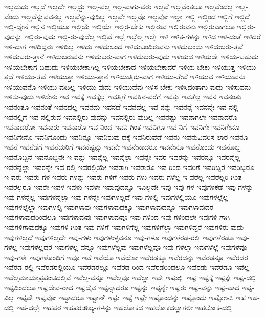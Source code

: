 {ಇಲ್ಲದುದು
ಇಲ್ಲದೆ
ಇಲ್ಲದೇ
ಇಲ್ಲದ್ದು
ಇಲ್ಲ-ವಲ್ಲ
ಇಲ್ಲ-ವಾಗು-ವರು
ಇಲ್ಲವೆ
ಇಲ್ಲವೆಂತಲೂ
ಇಲ್ಲವೆಂದಲ್ಲ
ಇಲ್ಲ-ವೆಂದು
ಇಲ್ಲವೆನ್ನುವವನಲ್ಲ
ಇಲ್ಲವೆನ್ನು-ವುದಿಲ್ಲ
ಇಲ್ಲವೇ
ಇಲ್ಲವೊ
ಇಲ್ಲವೋ
ಇಲ್ಲಾ
ಇಲ್ಲಿ
ಇಲ್ಲಿಂದ
ಇಲ್ಲಿಗೆ
ಇಲ್ಲಿದೆ
ಇಲ್ಲಿ-ದ್ದೇನೆ
ಇಲ್ಲಿನ
ಇಲ್ಲಿಯೂ
ಇಲ್ಲಿಯೆ
ಇಲ್ಲಿಯೇ
ಇಲ್ಲಿರ-ಬೇಕು
ಇಲ್ಲಿರುವ
ಇಲ್ಲಿರುವನು
ಇಲ್ಲಿರುವಾಗಲೂ
ಇಲ್ಲಿರು-ವುದನ್ನು
ಇಲ್ಲಿರು-ವುದು
ಇಲ್ಲಿ-ರು-ವುದೆಲ್ಲ
ಇಲ್ಲಿವೆ
ಇಲ್ಲೆ
ಇಲ್ಲೆಲ್ಲ
ಇಲ್ಲೇ
ಇಳಿ
ಇಳಿತ-ಗಳನ್ನು
ಇಳಿದ
ಇಳಿ-ದಂತೆ
ಇಳಿದರೆ
ಇಳಿ-ದಾಗ
ಇಳಿದಿದ್ದರು
ಇಳಿದಿಲ್ಲ
ಇಳಿದು
ಇಳಿದುಬಂದ
ಇಳಿದುಬಂದಿರುವನು
ಇಳಿದುಬಂದು
ಇಳಿದುಬರು-ತ್ತವೆ
ಇಳಿದುಬರು-ತ್ತಾನೆ
ಇಳಿದುಬರುವನು
ಇಳಿದುಬರು-ವಾಗ
ಇಳಿದುಬರು-ವುದು
ಇಳಿಯದ
ಇಳಿಯದೇ
ಇಳಿಯ-ಬಹುದು
ಇಳಿಯಬೇಕಾಗ-ಬಹುದು
ಇಳಿಯಬೇಕಾಗಿಲ್ಲ
ಇಳಿಯಬೇಕಾದ
ಇಳಿಯಬೇಕಾದರೆ
ಇಳಿಯ-ಬೇಕು
ಇಳಿಯುತ್ತ
ಇಳಿಯು-ತ್ತದೆ
ಇಳಿಯು-ತ್ತವೆ
ಇಳಿಯುತ್ತಾ
ಇಳಿಯು-ತ್ತಾನೆ
ಇಳಿಯುತ್ತಿರು-ವಾಗ
ಇಳಿಯು-ತ್ತೇವೆ
ಇಳಿಯುವ
ಇಳಿಯುವನು
ಇಳಿಯುವನೊ
ಇಳಿಯು-ವುದಿಲ್ಲ
ಇಳಿಯು-ವುದು
ಇಳಿಯುವೆವು
ಇಳಿಸ-ಬೇಕು
ಇಳಿಸಿದಂತಾಗು-ವುದು
ಇಳಿಸುವನು
ಇಳಿಸು-ವುದು
ಇಳಿಸೇನು
ಇವ
ಇವಕ್ಕೆ
ಇವಕ್ಕೆಲ್ಲ
ಇವತ್ತಿಗೆ
ಇವತ್ತಿನ-ವರೆಗೆ
ಇವತ್ತು
ಇವತ್ತೆಲ್ಲ
ಇವನ
ಇವನಂತು
ಇವನಂತೂ
ಇವನಂತೆ
ಇವನದಲ್ಲ
ಇವನದು
ಇವನದೆ
ಇವನದೆಲ್ಲ
ಇವ-ನನ್ನು
ಇವನನ್ನೆ
ಇವನನ್ನೇ
ಇವ-ನಲ್ಲಿ
ಇವನಲ್ಲಿಗೆ
ಇವ-ನಲ್ಲಿರುವ
ಇವನಲ್ಲಿರು-ವುದನ್ನು
ಇವನಲ್ಲಿರು-ವುದಿಲ್ಲ
ಇವನಷ್ಟು
ಇವನಾಗಲೇ
ಇವನಾದರೊ
ಇವನಾದರೋ
ಇವನಾರು
ಇವನಾರೊ
ಇವ-ನಿಂದ
ಇವನಿ-ಗಿಂತ
ಇವನಿಗೂ
ಇವ-ನಿಗೆ
ಇವನಿಗೇ
ಇವನಿಗೇನೂ
ಇವನಿಗೇನೊ
ಇವನಿಗೊಂದು
ಇವನಿನ್ನೂ
ಇವನಿರುವು-ದಕ್ಕೆ
ಇವನಿರುವೆಡೆ
ಇವನು
ಇವನುವಿವರಿಸ-ಲಾರ
ಇವನೂ
ಇವನೆ
ಇವನೆಡೆಗೆ
ಇವನೆದುರಿಗೆ
ಇವನೆಷ್ಟನ್ನು
ಇವನೇ
ಇವನೇನಾದರೂ
ಇವನೇನೂ
ಇವನೊಂದು
ಇವನೊಬ್ಬ
ಇವನೊಬ್ಬನೆ
ಇವನೊಬ್ಬನೇ
ಇ-ವನ್ನು
ಇವನ್ನೆಲ್ಲ
ಇವನ್ನೆಲ್ಲಾ
ಇವನ್ನೇ
ಇವರ
ಇವರನ್ನು
ಇವರನ್ನೂ
ಇವರನ್ನೆಲ್ಲ
ಇವರನ್ನೆಲ್ಲಾ
ಇವರನ್ನೇ
ಇವ-ರಲ್ಲಿ
ಇವರಲ್ಲಿಯೇ
ಇವರಾಗಿ
ಇವರಾರೂ
ಇವ-ರಿಂದ
ಇವರಿಗೆ
ಇವರಿಬ್ಬರ
ಇವರಿಬ್ಬರೂ
ಇ-ವರು
ಇವರು-ಗಳ
ಇವರು-ಗಳನ್ನು
ಇವರು-ಗಳಿಗೆ
ಇವರು-ಗಳು
ಇವರು-ಗಳೆಲ್ಲ
ಇ-ವರೆಲ್ಲ
ಇವರೆಲ್ಲರಿ-ಗಿಂತ
ಇವರೆಲ್ಲರೂ
ಇವರೇ
ಇವಳ
ಇವಳು
ಇವಳೇ
ಇವಾವುದನ್ನೂ
ಇವಿಲ್ಲದೇ
ಇವು
ಇವು-ಗಳ
ಇವುಗಳಕಡೆ
ಇವು-ಗಳನ್ನು
ಇವು-ಗಳನ್ನೆಲ್ಲ
ಇವುಗಳನ್ನೆಲ್ಲಾ
ಇವು-ಗಳನ್ನೇ
ಇವುಗಳಲ್ಲದೆ
ಇವು-ಗಳಲ್ಲಿ
ಇವುಗಳಲ್ಲಿಯೂ
ಇವುಗಳಲ್ಲೆಲ್ಲ
ಇವುಗಳಲ್ಲೆಲ್ಲಾ
ಇವುಗಳಲ್ಸಿ
ಇವುಗಳಾವು
ಇವುಗಳಾವುದಕ್ಕೂ
ಇವುಗಳಾವುದನ್ನೂ
ಇವುಗಳಾವುದರ
ಇವುಗಳಾವುದರಿಂದಲೂ
ಇವುಗಳಾವುವು
ಇವುಗಳಾವುವೂ
ಇವು-ಗಳಿಂದ
ಇವು-ಗಳಿಂದಲೇ
ಇವುಗಳಿ-ಗಾಗಿ
ಇವುಗಳಿಗಾವುದಕ್ಕೂ
ಇವುಗಳಿ-ಗಿಂತ
ಇವು-ಗಳಿಗೆ
ಇವುಗಳಿಗೆಲ್ಲ
ಇವುಗಳಿಗೆಲ್ಲಾ
ಇವುಗಳಿದ್ದರೆ
ಇವುಗಳಿರು-ವುದು
ಇವುಗಳಿಲ್ಲದೆ
ಇವುಗಳಿಲ್ಲದೇ
ಇವು-ಗಳು
ಇವುಗಳುಳ್ಳವನೂ
ಇವು-ಗಳೂ
ಇವುಗಳೆರಡ-ರಲ್ಲಿ
ಇವುಗಳೆರಡೂ
ಇವು-ಗಳೆಲ್ಲ
ಇವುಗಳೆಲ್ಲದರ
ಇವುಗಳೆಲ್ಲ-ವನ್ನೂ
ಇವುಗಳೆಲ್ಲವು
ಇವುಗಳೆಲ್ಲವೂ
ಇವು-ಗಳೆಲ್ಲಾ
ಇವುಗಳೆಲ್ಲೆ
ಇವುಗಳೆವೂ
ಇವು-ಗಳೇ
ಇವುಗಳೊಂದಿಗೆ
ಇವೂ
ಇವೆ
ಇವೆಯೊ
ಇವೆಯೋ
ಇವೆರಡಕ್ಕೂ
ಇವೆರಡನ್ನು
ಇವೆರಡನ್ನೂ
ಇವೆರಡರ
ಇವೆರಡ-ರಲ್ಲಿ
ಇವೆರಡರಲ್ಲಿಯೂ
ಇವೆರಡರಲ್ಲೂ
ಇವೆರಡ-ರಿಂದ
ಇವೆರಡರಿಂದಲೂ
ಇವೆರಡು
ಇವೆರಡೂ
ಇವೆಲ್ಲ
ಇವೆಲ್ಲಮಾಯಾಪ್ರಪಂಚದಲ್ಲಿವೆ
ಇವೆಲ್ಲ-ವನ್ನೂ
ಇವೆಲ್ಲವೂ
ಇವೆಲ್ಲಾ
ಇವೇ
ಇಷುಭಿಃ
ಇಷ್ಟ
ಇಷ್ಟಕ್ಕೆ
ಇಷ್ಟಕ್ಕೇ
ಇಷ್ಟ-ದಲ್ಲಿ
ಇಷ್ಟದಿಂದಲೂ
ಇಷ್ಟದೇವ-ರಾದ
ಇಷ್ಟದೈವ
ಇಷ್ಟನ್ನಾದರೂ
ಇಷ್ಟನ್ನು
ಇಷ್ಟನ್ನೇ
ಇಷ್ಟರು
ಇಷ್ಟ-ವನ್ನು
ಇಷ್ಟ-ವಾದ
ಇಷ್ಟ-ವಿಲ್ಲ
ಇಷ್ಟವೇ
ಇಷ್ಟವೋ
ಇಷ್ಟಾದರೂ
ಇಷ್ಟಾನ್
ಇಷ್ಟು
ಇಷ್ಟೆ
ಇಷ್ಟೇ
ಇಷ್ಟೊಂದನ್ನು
ಇಷ್ಟೊಂದು
ಇಷ್ಟೋಽಸಿ
ಇಹ
ಇಹ-ದಲ್ಲಿ
ಇಹ-ದಲ್ಲೇ
ಇಹಪರ
ಇಹಪರಸೌಖ್ಯ-ಗಳನ್ನು
ಇಹಲೋಕದ
ಇಹಲೋಕದಲ್ಲಾಗಲೀ
ಇಹಲೋಕ-ದಲ್ಲಿ
}
